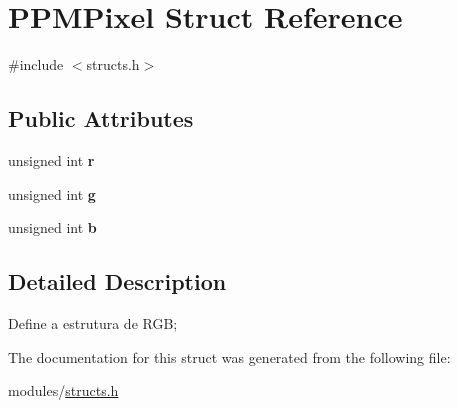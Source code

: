 \hypertarget{structPPMPixel}{}\section{P\+P\+M\+Pixel Struct Reference}
\label{structPPMPixel}


{\ttfamily \#include $<$structs.\+h$>$}

\subsection*{Public Attributes}
\begin{DoxyCompactItemize}
\item 
\mbox{\label{structPPMPixel_a32368d794f15126e6675a4d3b34c80b9}} 
unsigned int {\bfseries r}
\item 
\mbox{\label{structPPMPixel_afa8bf65c0126e407c1c853a4d370a164}} 
unsigned int {\bfseries g}
\item 
\mbox{\label{structPPMPixel_a83fd639df9d3cf97e989e6545a23c51c}} 
unsigned int {\bfseries b}
\end{DoxyCompactItemize}


\subsection{Detailed Description}
Define a estrutura de R\+GB; 

The documentation for this struct was generated from the following file\+:\begin{DoxyCompactItemize}
\item 
modules/\hyperlink{structs_8h}{structs.\+h}\end{DoxyCompactItemize}
